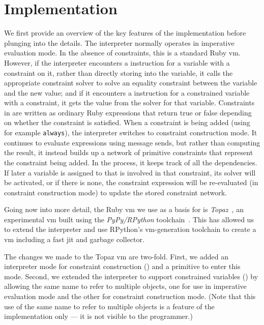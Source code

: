 \section{Implementation}
\label{sec:implementation} 

We first provide an overview of the key features of the implementation
before plunging into the details.  The interpreter normally operates
in imperative evaluation mode.  In the absence of constraints, this is
a standard Ruby \ac{vm}.  However, if the interpreter encounters a
\store instruction for a variable with a constraint on it, rather than
directly storing into the variable, it calls the appropriate
constraint solver to solve an equality constraint between the variable
and the new value; and if it encounters a \load instruction for a
constrained variable with a constraint, it gets the value from the
solver for that variable.  Constraints in \toolname are written as
ordinary Ruby expressions that return true or false depending on
whether the constraint is satisfied.  When a constraint is being added
(using for example \lstinline{always}), the interpreter switches to
constraint construction mode.  It continues to evaluate expressions
using message sends, but rather than computing the result, it instead
builds up a network of primitive constraints that represent the
constraint being added.  In the process, it keeps track of all the
dependencies. If later a variable is assigned to that is involved in
that constraint, its solver will be activated, or if there is none,
the constraint expression will be re-evaluated (in constraint
construction mode) to update the stored constraint network.

Going now into more detail, the Ruby \ac{vm} we use as a basis for
\toolname is \emph{Topaz}~\cite{FelgentreffTopazWroclove2013}, an
experimental \ac{vm} built using the \emph{PyPy/RPython}
toolchain~\cite{rigo2006pypy}. This has allowed us to extend the
interpreter and use RPython's \ac{vm}-generation toolchain to create a
\ac{vm} including a fast \ac{jit} and garbage collector.

The changes we made to the Topaz \ac{vm} are two-fold.  First, we
added an interpreter mode for constraint construction
() and a primitive to enter
this mode.  Second, we extended the interpreter to support constrained
variables () by allowing the
same name to refer to multiple objects, one for use in imperative
evaluation mode and the other for constraint construction mode.  (Note
that this use of the same name to refer to multiple objects is a
feature of the implementation only --- it is not visible to the
programmer.)

